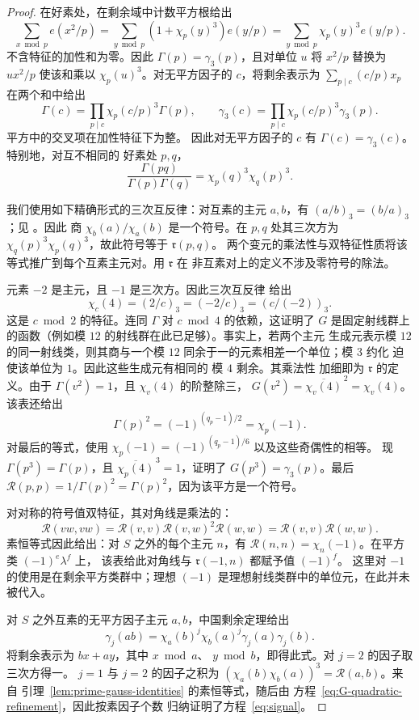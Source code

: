 \documentclass[11pt,a4paper]{article}
\numberwithin{equation}{section}
\numberwithin{figure}{section}
\theoremstyle{definition}
\theoremstyle{remark}
\begin{document}
\begin{proof}
在好素处，在剩余域中计数平方根给出
\[
 \sum_{x\bmod p}e(x^2/p)
 =\sum_{y\bmod p}(1+\chi_p(y)^3)e(y/p)
 =\sum_{y\bmod p}\chi_p(y)^3e(y/p).
\]
不含特征的加性和为零。因此
$\Gamma(p)=\gamma_3(p)$，且对单位 $u$ 将 $x^2/p$ 替换为 $ux^2/p$
使该和乘以 $\chi_p(u)^3$。对无平方因子的 $c$，将剩余表示为
$\sum_{p\mid c}(c/p)x_p$ 在两个和中给出
\[
 \Gamma(c)=\prod_{p\mid c}\chi_p(c/p)^3\Gamma(p),\qquad
 \gamma_3(c)=\prod_{p\mid c}\chi_p(c/p)^3\gamma_3(p).
\]
平方中的交叉项在加性特征下为整。
因此对无平方因子的 $c$ 有 $\Gamma(c)=\gamma_3(c)$。特别地，对互不相同的
好素处 $p,q$，
\[
 \frac{\Gamma(pq)}{\Gamma(p)\Gamma(q)}
 =\chi_p(q)^3\chi_q(p)^3.
\]

我们使用如下精确形式的三次互反律：对互素的主元
$a,b$，有 $(a/b)_3=(b/a)_3$；见 \cite[方程 (1.4)]{DR}。因此
商 $\chi_b(a)/\chi_a(b)$ 是一个符号。在 $p,q$ 处其三次方为
$\chi_q(p)^3\chi_p(q)^3$，故此符号等于 $\mathfrak r(p,q)$。
两个变元的乘法性与双特征性质将该
等式推广到每个互素主元对。用 $\mathfrak r$ 在
非互素对上的定义不涉及零符号的除法。

元素 $-2$ 是主元，且 $-1$ 是三次方。因此三次互反律
给出
\[
 \chi_c(4)=(2/c)_3=(-2/c)_3=(c/(-2))_3.
\]
这是 $c\bmod2$ 的特征。连同 $\Gamma$ 对
$c\bmod4$ 的依赖，这证明了 $G$ 是固定射线群上的函数（例如模 $12$
的射线群在此已足够）。事实上，若两个主元
生成元表示模 $12$ 的同一射线类，则其商与一个模 $12$
同余于一的元素相差一个单位；模 $3$ 约化
迫使该单位为 $1$。因此这些生成元有相同的
模 $4$ 剩余。其乘法性
加细即为 $\mathfrak r$ 的定义。由于
$\Gamma(v^2)=1$，且 $\chi_v(4)$ 的阶整除三，
$G(v^2)=\overline{\chi_v(4)}^{\,2}=\chi_v(4)$。该表还给出
\[
 \Gamma(p)^2=(-1)^{(q_p-1)/2}=\chi_p(-1).
\]
对最后的等式，使用
$\chi_p(-1)=(-1)^{(q_p-1)/6}$ 以及这些奇偶性的相等。
现 $\Gamma(p^3)=\Gamma(p)$，且
$\overline{\chi_p(4)}^{\,3}=1$，证明了 $G(p^3)=\gamma_3(p)$。最后
$\mathcal R(p,p)=1/\Gamma(p)^2=\Gamma(p)^2$，因为该平方是一个符号。

对对称的符号值双特征，其对角线是乘法的：
\[
 \mathcal R(vw,vw)
 =\mathcal R(v,v)\mathcal R(v,w)^2\mathcal R(w,w)
 =\mathcal R(v,v)\mathcal R(w,w).
\]
素恒等式因此给出：对 $S$ 之外的每个主元
$n$，有 $\mathcal R(n,n)=\chi_n(-1)$。在平方类 $(-1)^e\lambda^f$ 上，
该表给此对角线与 $\mathfrak r(-1,n)$ 都赋予值 $(-1)^f$。
这里对 $-1$ 的使用是在剩余平方类群中；理想 $(-1)$
是理想射线类群中的单位元，在此并未被代入。

对 $S$ 之外互素的无平方因子主元 $a,b$，中国剩余定理给出
\[
 \gamma_j(ab)=\chi_a(b)^j\chi_b(a)^j\gamma_j(a)\gamma_j(b).
\]
将剩余表示为 $bx+ay$，其中 $x\bmod a$、
$y\bmod b$，即得此式。对 $j=2$ 的因子取三次方得一。
$j=1$ 与 $j=2$ 的因子之积为
$(\chi_a(b)\chi_b(a))^3=\mathcal R(a,b)$。来自
引理~\ref{lem:prime-gauss-identities} 的素恒等式，随后由
方程~\eqref{eq:G-quadratic-refinement}，因此按素因子个数
归纳证明了方程~\eqref{eq:signal}。
\end{proof}
\end{document}
